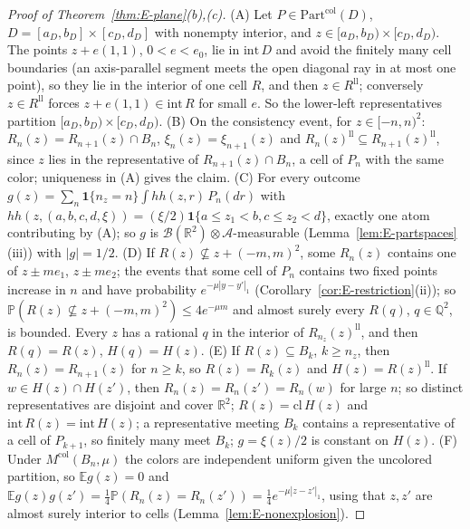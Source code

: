 \documentclass[11pt]{article}
\theoremstyle{plain}
\theoremstyle{definition}
\theoremstyle{remark}
\newcommand{\R}{\mathbb{R}}
\newcommand{\Q}{\mathbb{Q}}
\newcommand{\E}{\mathbb{E}}
\newcommand{\PP}{\mathbb{P}}
\newcommand{\cB}{\mathcal{B}}
\newcommand{\cA}{\mathcal{A}}
\newcommand{\ind}{\mathbf{1}}
\newcommand{\Part}{\mathrm{Part}}
\newcommand{\Mcol}{M^{\mathrm{col}}}
\begin{document}
\begin{proof}[Proof of Theorem~\ref{thm:E-plane}(b),(c)]
(A) Let $P\in\Part^{\mathrm{col}}(D)$, $D=[a_D,b_D]\times[c_D,d_D]$ with nonempty interior, and
$z\in[a_D,b_D)\times[c_D,d_D)$. The points $z+e(1,1)$, $0<e<e_0$, lie in $\mathrm{int}\,D$ and avoid the
finitely many cell boundaries (an axis-parallel segment meets the open diagonal
ray in at most one point), so they lie in the interior of one cell $R$, and then
$z\in R^{\mathrm{ll}}$; conversely $z\in R^{\mathrm{ll}}$ forces $z+e(1,1)\in\mathrm{int}\,R$ for small $e$. So the lower-left
representatives partition $[a_D,b_D)\times[c_D,d_D)$. (B) On the consistency event, for
$z\in[-n,n)^{2}$: $R_n(z)=R_{n+1}(z)\cap B_n$, $\xi_n(z)=\xi_{n+1}(z)$ and $R_n(z)^{\mathrm{ll}}\subseteq R_{n+1}(z)^{\mathrm{ll}}$, since
$z$ lies in the representative of $R_{n+1}(z)\cap B_n$, a cell of $P_n$ with the same color;
uniqueness in (A) gives the claim. (C) For every outcome
$g(z)=\sum_n\ind\{n_z=n\}\int hh(z,r)\,P_n(dr)$ with
$hh(z,(a,b,c,d,\xi))=(\xi/2)\ind\{a\le z_1<b,c\le z_2<d\}$, exactly one atom contributing by (A); so $g$
is $\cB(\R^{2})\otimes\cA$-measurable (Lemma~\ref{lem:E-partspaces}(iii)) with $|g|=1/2$. (D) If
$R(z)\not\subseteq z+(-m,m)^{2}$, some $R_n(z)$ contains one of $z\pm me_1$, $z\pm me_2$; the events that
some cell of $P_n$ contains two fixed points increase in $n$ and have probability
$e^{-\mu|y-y'|_1}$ (Corollary~\ref{cor:E-restriction}(ii)); so
$\PP(R(z)\not\subseteq z+(-m,m)^{2})\le4e^{-\mu m}$ and almost surely every $R(q)$, $q\in\Q^{2}$, is bounded. Every $z$
has a rational $q$ in the interior of $R_{n_z}(z)^{\mathrm{ll}}$, and then $R(q)=R(z)$, $H(q)=H(z)$. (E) If
$R(z)\subseteq B_k$, $k\ge n_z$, then $R_n(z)=R_{n+1}(z)$ for $n\ge k$, so $R(z)=R_k(z)$ and $H(z)=R(z)^{\mathrm{ll}}$. If
$w\in H(z)\cap H(z')$, then $R_n(z)=R_n(z')=R_n(w)$ for large $n$; so distinct representatives
are disjoint and cover $\R^{2}$; $R(z)=\mathrm{cl}\,H(z)$ and $\mathrm{int}\,R(z)=\mathrm{int}\,H(z)$; a representative
meeting $B_k$ contains a representative of a cell of $P_{k+1}$, so finitely many meet
$B_k$; $g=\xi(z)/2$ is constant on $H(z)$. (F) Under $\Mcol(B_n,\mu)$ the colors are independent
uniform given the uncolored partition, so $\E g(z)=0$ and
$\E g(z)g(z')=\tfrac14\PP(R_n(z)=R_n(z'))=\tfrac14e^{-\mu|z-z'|_1}$, using that $z,z'$ are almost surely interior
to cells (Lemma~\ref{lem:E-nonexplosion}).
\end{proof}
\end{document}
